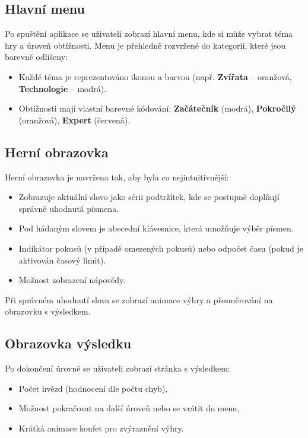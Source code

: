 \documentclass[a4paper,12pt]{article}
\begin{document}
\subsection{Hlavní menu}

Po spuštění aplikace se uživateli zobrazí hlavní menu, kde si může vybrat téma hry a úroveň obtížnosti. Menu je přehledně rozvržené do kategorií, které jsou barevně odlišeny:

\begin{itemize}
    \item Každé téma je reprezentováno ikonou a barvou (např. \textbf{Zvířata} – oranžová, \textbf{Technologie} – modrá).
    \item Obtížnosti mají vlastní barevné kódování: \textbf{Začátečník} (modrá), \textbf{Pokročilý} (oranžová), \textbf{Expert} (červená).
\end{itemize}

\subsection{Herní obrazovka}

Herní obrazovka je navržena tak, aby byla co nejintuitivnější:
\begin{itemize}
    \item Zobrazuje aktuální slovo jako sérii podtržítek, kde se postupně doplňují správně uhodnutá písmena.
    \item Pod hádaným slovem je abecední klávesnice, která umožňuje výběr písmen.
    \item Indikátor pokusů (v případě omezených pokusů) nebo odpočet času (pokud je aktivován časový limit).
    \item Možnost zobrazení nápovědy.
\end{itemize}

Při správném uhodnutí slova se zobrazí animace výhry a přesměrování na obrazovku s výsledkem.

\subsection{Obrazovka výsledku}

Po dokončení úrovně se uživateli zobrazí stránka s výsledkem:
\begin{itemize}
    \item Počet hvězd (hodnocení dle počtu chyb),
    \item Možnost pokračovat na další úroveň nebo se vrátit do menu,
    \item Krátká animace konfet pro zvýraznění výhry.
\end{itemize}
\end{document}
